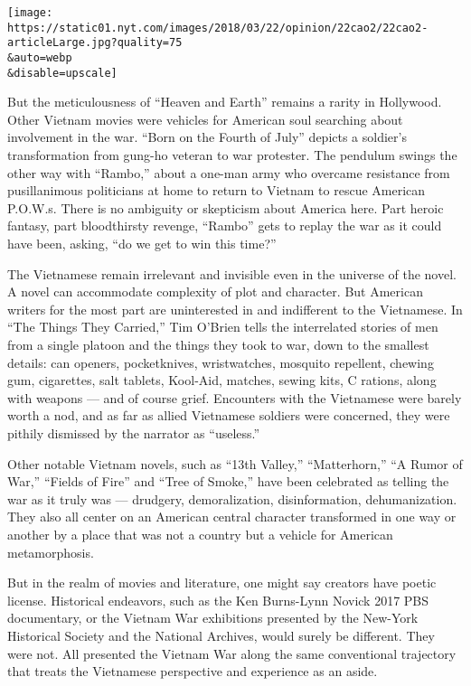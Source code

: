 \texttt{[image: https://static01.nyt.com/images/2018/03/22/opinion/22cao2/22cao2-articleLarge.jpg?quality=75\\\&auto=webp\\\&disable=upscale]}

But the meticulousness of ``Heaven and Earth'' remains a rarity in
Hollywood. Other Vietnam movies were vehicles for American soul
searching about involvement in the war. ``Born on the Fourth of July''
depicts a soldier's transformation from gung-ho veteran to war
protester. The pendulum swings the other way with ``Rambo,'' about a
one-man army who overcame resistance from pusillanimous politicians at
home to return to Vietnam to rescue American P.O.W.s. There is no
ambiguity or skepticism about America here. Part heroic fantasy, part
bloodthirsty revenge, ``Rambo'' gets to replay the war as it could have
been, asking, ``do we get to win this time?''

The Vietnamese remain irrelevant and invisible even in the universe of
the novel. A novel can accommodate complexity of plot and character. But
American writers for the most part are uninterested in and indifferent
to the Vietnamese. In ``The Things They Carried,'' Tim O'Brien tells the
interrelated stories of men from a single platoon and the things they
took to war, down to the smallest details: can openers, pocketknives,
wristwatches, mosquito repellent, chewing gum, cigarettes, salt tablets,
Kool-Aid, matches, sewing kits, C rations, along with weapons --- and of
course grief. Encounters with the Vietnamese were barely worth a nod,
and as far as allied Vietnamese soldiers were concerned, they were
pithily dismissed by the narrator as ``useless.''

Other notable Vietnam novels, such as ``13th Valley,'' ``Matterhorn,''
``A Rumor of War,'' ``Fields of Fire'' and ``Tree of Smoke,'' have been
celebrated as telling the war as it truly was --- drudgery,
demoralization, disinformation, dehumanization. They also all center on
an American central character transformed in one way or another by a
place that was not a country but a vehicle for American metamorphosis.

But in the realm of movies and literature, one might say creators have
poetic license. Historical endeavors, such as the Ken Burns-Lynn Novick
2017 PBS documentary, or the Vietnam War exhibitions presented by the
New-York Historical Society and the National Archives, would surely be
different. They were not. All presented the Vietnam War along the same
conventional trajectory that treats the Vietnamese perspective and
experience as an aside.

